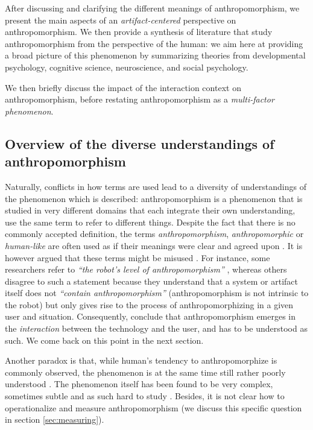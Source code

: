 \documentclass{frontiersSCNS} %
\begin{document}
After discussing and clarifying the different meanings of anthropomorphism, we
present the main aspects of an \emph{artifact-centered} perspective on
anthropomorphism. We then provide a synthesis of literature that study
 anthropomorphism from the perspective of the human: we aim here at providing a broad
picture of this phenomenon by summarizing theories from developmental
psychology, cognitive science, neuroscience, and social psychology.

We then briefly discuss the impact of the interaction context on
anthropomorphism, before restating anthropomorphism as a \emph{multi-factor
phenomenon}.

\subsection{Overview of the diverse understandings of anthropomorphism}
\label{meaning}

Naturally, conflicts in how terms are used lead to a diversity of understandings
of the phenomenon which is described: anthropomorphism is a phenomenon that is
studied in very different domains that each integrate their own understanding,
use the same term to refer to different things.  Despite the fact that there is
no commonly accepted definition, the terms \textit{anthropomorphism},
\textit{anthropomorphic} or \textit{human-like} are often used as if their
meanings were clear and agreed upon \citep{persson_anthropomorphism_2000}. It is
however argued that these terms might be misused
\citep{duffy_anthropomorphism_2002,epley_when_2008}.  For instance, some
researchers refer to \textit{``the robot's level of anthropomorphism''}
\citep{bartneck_is_2007,feil-seifer_human-robot_2008}, whereas others disagree
to such a statement because they understand that a system or artifact itself
does not \textit{``contain anthropomorphism''} (anthropomorphism is not
intrinsic to the robot) but only gives rise to the process of anthropomorphizing
in a given user and situation. Consequently,
\cite{persson_anthropomorphism_2000} conclude that anthropomorphism emerges in
the \textit{interaction} between the technology and the user, and has to be
understood as such. We come back on this point in the next section.


Another paradox is that, while human's tendency to anthropomorphize is commonly
observed, the phenomenon is at the same time still rather poorly understood
\citep{epley_seeing_2007}. The phenomenon itself has been found to be very
complex, sometimes subtle and as such hard to study
\citep{duffy_anthropomorphism_2002,epley_when_2008}. Besides, it is not clear
how to operationalize and measure anthropomorphism (we discuss this specific question
in section \ref{sec:measuring}).
\end{document}
